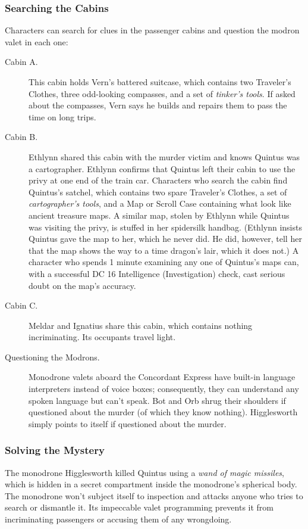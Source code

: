 \documentclass[10pt,a4paper,twoside,bg=print,twocolumn,openany,nodeprecatedcode]{dndarticle}
\begin{document}
\subsubsection{Searching the Cabins}
Characters can search for clues in the passenger cabins and question the modron valet in each one:


\begin{description}
\item[Cabin A.]
This cabin holds Vern's battered suitcase, which contains two Traveler's Clothes, three odd-looking compasses, and a set of \textit{tinker's tools}. If asked about the compasses, Vern says he builds and repairs them to pass the time on long trips.
\item[Cabin B.]
Ethlynn shared this cabin with the murder victim and knows Quintus was a cartographer. Ethlynn confirms that Quintus left their cabin to use the privy at one end of the train car. Characters who search the cabin find Quintus's satchel, which contains two spare Traveler's Clothes, a set of \textit{cartographer's tools}, and a Map or Scroll Case containing what look like ancient treasure maps. A similar map, stolen by Ethlynn while Quintus was visiting the privy, is stuffed in her spidersilk handbag. (Ethlynn insists Quintus gave the map to her, which he never did. He did, however, tell her that the map shows the way to a time dragon's lair, which it does not.) A character who spends 1 minute examining any one of Quintus's maps can, with a successful DC 16 Intelligence (Investigation) check, cast serious doubt on the map's accuracy.
\item[Cabin C.]
Meldar and Ignatius share this cabin, which contains nothing incriminating. Its occupants travel light.
\item[Questioning the Modrons.]
Monodrone valets aboard the Concordant Express have built-in language interpreters instead of voice boxes; consequently, they can understand any spoken language but can't speak. Bot and Orb shrug their shoulders if questioned about the murder (of which they know nothing). Higglesworth simply points to itself if questioned about the murder.
\end{description}

\subsubsection{Solving the Mystery}
The monodrone Higglesworth killed Quintus using a \textit{wand of magic missiles}, which is hidden in a secret compartment inside the monodrone's spherical body. The monodrone won't subject itself to inspection and attacks anyone who tries to search or dismantle it. Its impeccable valet programming prevents it from incriminating passengers or accusing them of any wrongdoing.
\end{document}
